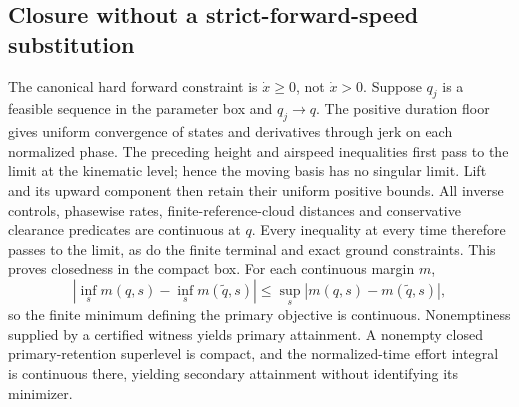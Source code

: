 \subsection*{Closure without a strict-forward-speed substitution}
The canonical hard forward constraint is $\dot x\ge0$, not
$\dot x>0$.  Suppose $q_j$ is a feasible sequence in the parameter
box and $q_j\to q$.  The positive duration floor gives uniform
convergence of states and derivatives through jerk on each
normalized phase.  The preceding height and airspeed inequalities
first pass to the limit at the kinematic level; hence the moving
basis has no singular limit.  Lift and its upward component then
retain their uniform positive bounds.  All inverse controls,
phasewise rates, finite-reference-cloud distances and conservative
clearance predicates are continuous at $q$.  Every inequality at
every time therefore passes to the limit, as do the finite
terminal and exact ground constraints.  This proves closedness
in the compact box.  For each continuous margin $m$,
\[
 \left|\inf_s m(q,s)-\inf_s m(\widetilde q,s)\right|
 \le\sup_s|m(q,s)-m(\widetilde q,s)|,
\]
so the finite minimum defining the primary objective is continuous.
Nonemptiness supplied by a certified witness yields primary
attainment.  A nonempty closed primary-retention superlevel is
compact, and the normalized-time effort integral is continuous
there, yielding secondary attainment without identifying its
minimizer.
